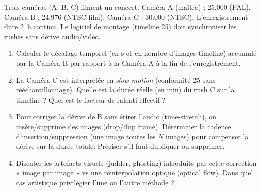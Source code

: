 \documentclass[11pt]{article}
\begin{document}
\begin{exercice}
Trois caméras (A, B, C) filment un concert. Caméra A (maître) : \SI{25.000}{} (PAL). Caméra B : \SI{24.976}{} (NTSC film). Caméra C : \SI{30.000}{} (NTSC). L'enregistrement dure \SI{2}{\hour} continu. Le logiciel de montage (timeline \SI{25}{}) doit synchroniser les rushes sans dérive audio/vidéo.
\begin{enumerate}
    \item Calculer le décalage temporel (en \si{\second} et en nombre d'images timeline) accumulé par la Caméra B par rapport à la Caméra A à la fin de l'enregistrement.
    \item La Caméra C est interprétée en \textit{slow motion} (conformité \SI{25}{} sans rééchantillonnage). Quelle est la durée réelle (en \si{\minute}) du rush C sur la timeline ? Quel est le facteur de ralenti effectif ?
    \item Pour corriger la dérive de B sans étirer l'audio (time-stretch), on insère/supprime des images (drop/dup frame). Déterminer la cadence d'insertion/suppression (une image toutes les $N$ images) pour compenser la dérive sur la durée totale. Préciser s'il faut dupliquer ou supprimer.
    \item Discuter les artefacts visuels (judder, ghosting) introduits par cette correction « image par image » vs une réinterpolation optique (optical flow). Dans quel cas artistique privilégier l'une ou l'autre méthode ?
\end{enumerate}
\end{exercice}
\end{document}
